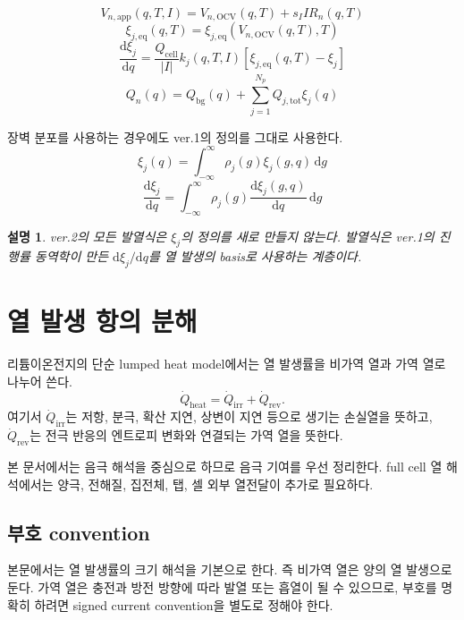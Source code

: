 \documentclass[11pt,a4paper]{article}
\newtheorem*{note}{설명}
\newcommand{\dd}{\mathrm{d}}
\newcommand{\OCV}{\mathrm{OCV}}
\newcommand{\app}{\mathrm{app}}
\newcommand{\eq}{\mathrm{eq}}
\newcommand{\tot}{\mathrm{tot}}
\newcommand{\bg}{\mathrm{bg}}
\newcommand{\cell}{\mathrm{cell}}
\begin{document}
\begin{equation}
V_{n,\app}(q,T,I)=V_{n,\OCV}(q,T)+s_IIR_n(q,T)
\label{eq:v2_Vapp_from_v1}
\end{equation}
\begin{equation}
\xi_{j,\eq}(q,T)=\xi_{j,\eq}\!\left(V_{n,\OCV}(q,T),T\right)
\label{eq:v2_xieq_from_v1}
\end{equation}
\begin{equation}
\frac{\dd\xi_j}{\dd q}=\frac{Q_{\cell}}{|I|}k_j(q,T,I)
\left[\xi_{j,\eq}(q,T)-\xi_j\right]
\label{eq:v2_xi_dyn_from_v1}
\end{equation}
\begin{equation}
Q_n(q)=Q_{\bg}(q)+\sum_{j=1}^{N_p}Q_{j,\tot}\xi_j(q)
\label{eq:v2_Q_from_v1}
\end{equation}

장벽 분포를 사용하는 경우에도 ver.1의 정의를 그대로 사용한다.
\begin{equation}
\xi_j(q)=\int_{-\infty}^{\infty}\rho_j(g)\xi_j(g,q)\,\dd g
\label{eq:v2_xi_dist_from_v1}
\end{equation}
\begin{equation}
\frac{\dd\xi_j}{\dd q}=\int_{-\infty}^{\infty}\rho_j(g)\frac{\dd\xi_j(g,q)}{\dd q}\,\dd g
\label{eq:v2_dxi_dist_from_v1}
\end{equation}

\begin{note}
ver.2의 모든 발열식은 \(\xi_j\)의 정의를 새로 만들지 않는다. 발열식은 ver.1의 진행률 동역학이 만든 \(\dd\xi_j/\dd q\)를 열 발생의 basis로 사용하는 계층이다.
\end{note}

\section{열 발생 항의 분해}
리튬이온전지의 단순 lumped heat model에서는 열 발생률을 비가역 열과 가역 열로 나누어 쓴다.
\begin{equation}
\dot Q_{\mathrm{heat}}=\dot Q_{\mathrm{irr}}+\dot Q_{\mathrm{rev}}.
\label{eq:v2_heat_decomp}
\end{equation}
여기서 \(\dot Q_{\mathrm{irr}}\)는 저항, 분극, 확산 지연, 상변이 지연 등으로 생기는 손실열을 뜻하고, \(\dot Q_{\mathrm{rev}}\)는 전극 반응의 엔트로피 변화와 연결되는 가역 열을 뜻한다.

본 문서에서는 음극 해석을 중심으로 하므로 음극 기여를 우선 정리한다. full cell 열 해석에서는 양극, 전해질, 집전체, 탭, 셀 외부 열전달이 추가로 필요하다.

\subsection{부호 convention}
본문에서는 열 발생률의 크기 해석을 기본으로 한다. 즉 비가역 열은 양의 열 발생으로 둔다. 가역 열은 충전과 방전 방향에 따라 발열 또는 흡열이 될 수 있으므로, 부호를 명확히 하려면 signed current convention을 별도로 정해야 한다.
\end{document}
